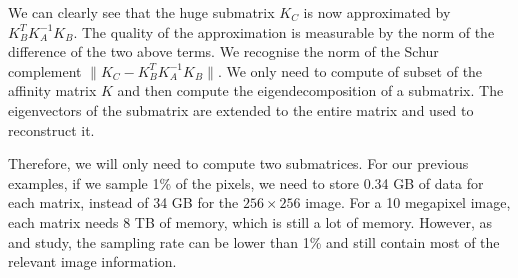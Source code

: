  We can clearly see that the huge submatrix \(K_C\) is now approximated by \(K_B^T K_A^{-1} K_B\).
 The quality of the approximation is measurable by the norm of the difference of the two above terms.
 We recognise the norm of the Schur complement \(\| K_C - K_B^T K_A^{-1} K_B \| \).
\else
 We only need to compute of subset of the affinity matrix \(K\) and then compute the eigendecomposition of a submatrix.
 The eigenvectors of the submatrix are extended to the entire matrix and used to reconstruct it.
\fi

Therefore, we will only need to compute two submatrices.
For our previous examples, if we sample 1\% of the pixels, we need to store 0.34 GB of data for each matrix, instead of 34 GB for the \(256 \times 256\) image.
For a 10 megapixel image, each matrix needs 8 TB of memory, which is still a lot of memory.
However, as \cite{fowlkes_spectral_2004} and \cite{glide_2014} study, the sampling rate can be lower than 1\% and still contain most of the relevant image information.
